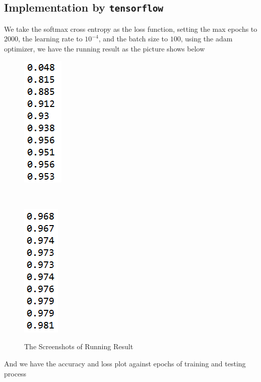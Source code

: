 \documentclass[10pt]{article}
\begin{document}
\subsection{Implementation by \texttt{tensorflow}}
We take the softmax cross entropy as the loss function, setting the max epochs to $2000$, the learning rate to $10^{-4}$, and the batch size to $100$, using the adam optimizer, we have the running result as the picture shows below
\begin{figure}[H]
\centering
\begin{minipage}[b]{0.45\textwidth}
\centering
\includegraphics[scale=1.]{fig1.png}
\label{fig3}
\end{minipage}
\
\begin{minipage}[b]{0.45\textwidth}
\centering
\includegraphics[scale=1.]{fig2.png}
\label{fig4}
\end{minipage}
\caption{The Screenshots of Running Result}
\end{figure}
And we have the accuracy and loss plot against epochs of training and testing process
\end{document}
